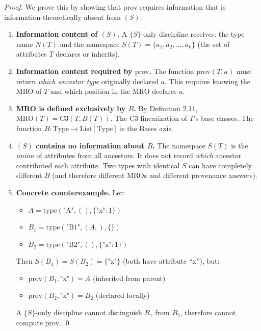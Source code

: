 \emph{Proof.} We prove this by showing that \(\text{prov}\) requires
information that is information-theoretically absent from \((S)\).

\begin{enumerate}
\def\labelenumi{\arabic{enumi}.}
\item
  \textbf{Information content of \((S)\).} A $\{S\}$-only discipline
  receives: the type name \(N(T)\) and the namespace
  \(S(T) = \{a_1, a_2, \ldots, a_k\}\) (the set of attributes \(T\)
  declares or inherits).
\item
  \textbf{Information content required by \(\text{prov}\).} The function
  \(\text{prov}(T, a)\) must return \emph{which ancestor type}
  originally declared \(a\). This requires knowing the MRO of \(T\) and
  which position in the MRO declares \(a\).
\item
  \textbf{MRO is defined exclusively by \(B\).} By Definition 2.11,
  \(\text{MRO}(T) = \text{C3}(T, B(T))\). The C3 linearization of
  \(T\)'s base classes. The function
  \(B : \text{Type} \to \text{List}[\text{Type}]\) is the Bases axis.
\item
  \textbf{\((S)\) contains no information about \(B\).} The namespace
  \(S(T)\) is the \emph{union} of attributes from all ancestors. It
  does not record \emph{which} ancestor contributed each attribute. Two
  types with identical \(S\) can have completely different \(B\) (and
  therefore different MROs and different provenance answers).
\item
  \textbf{Concrete counterexample.} Let:

  \begin{itemize}
  \tightlist
  \item
    \(A = \text{type}(\text{"A"}, (), \{\text{"x"}: 1\})\)
  \item
    \(B_1 = \text{type}(\text{"B1"}, (A,), \{\})\)
  \item
    \(B_2 = \text{type}(\text{"B2"}, (), \{\text{"x"}: 1\})\)
  \end{itemize}

  Then \(S(B_1) = S(B_2) = \{\text{"x"}\}\) (both have attribute ``x''),
  but:

  \begin{itemize}
  \tightlist
  \item
    \(\text{prov}(B_1, \text{"x"}) = A\) (inherited from parent)
  \item
    \(\text{prov}(B_2, \text{"x"}) = B_2\) (declared locally)
  \end{itemize}

  A $\{S\}$-only discipline cannot distinguish \(B_1\) from \(B_2\), therefore
  cannot compute \(\text{prov}\). \qed
\end{enumerate}

